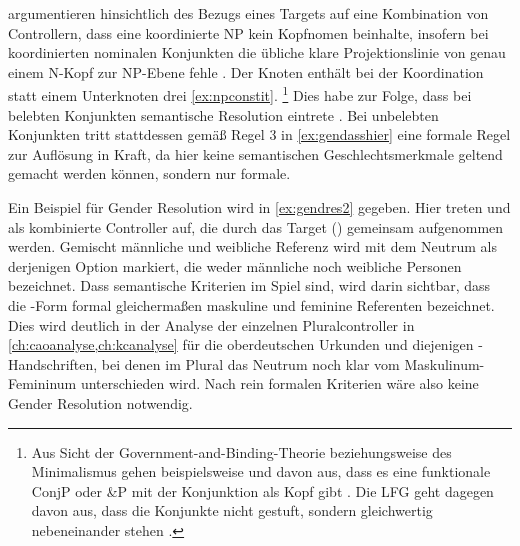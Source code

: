 \textcites[182--183]{wechslerzlatic2003}[576]{wechsler2009} argumentieren
hinsichtlich des Bezugs eines Targets auf eine Kombination von Controllern,
dass eine koordinierte NP kein Kopf\-nomen beinhalte, insofern bei
koordinierten nominalen Konjunkten die übliche klare Projektionslinie von genau
einem N-Kopf zur NP-Ebene fehle \autocites[183,
Anm.~85]{wechslerzlatic2003}[585, Anm.~7]{wechsler2009}. Der Knoten 
enthält bei der Koordination statt einem Unterknoten drei \cref{ex:npconstit}.%
%
	\footnote{Aus Sicht der Government-and-Binding-Theorie beziehungsweise des
	Minimalismus gehen beispielsweise
	\textcites{johannessen1998}{johannessen2005} und \citet{shen2019} davon aus, dass es
	eine funktionale ConjP oder \&P mit der Konjunktion als Kopf gibt
	\autocite[dagegen aber][]{borsley2005}. Die LFG geht dagegen davon aus,
	dass die Konjunkte nicht gestuft, sondern gleichwertig nebeneinander stehen
	\autocites[vgl.~z.\,B.][]{peterson2004}{sadlernordlinger2006}.}
%
Dies habe zur Folge, dass bei belebten Konjunkten semantische Resolution
eintrete \autocites[183]{wechslerzlatic2003}[576]{wechsler2009}. Bei unbelebten
Konjunkten tritt stattdessen gemäß Regel 3 in \cref{ex:gendasshier} eine
formale Regel zur Auflösung in Kraft, da hier keine semantischen
Geschlechtsmerkmale geltend gemacht werden können, sondern nur formale.

Ein Beispiel für Gender Resolution wird in \cref{ex:gendres2} gegeben. Hier
treten   und 
 als kombinierte Controller auf, die durch das
Target  (\NeutMF) gemeinsam aufgenommen werden. Gemischt männliche
und weibliche Referenz wird mit dem Neutrum als derjenigen Option markiert,
die weder männliche noch weibliche Personen bezeichnet. Dass semantische
Kriterien im Spiel sind, wird darin sichtbar, dass die -Form formal
gleichermaßen maskuline und feminine Referenten bezeichnet. Dies wird deutlich
in der Analyse der einzelnen Pluralcontroller in
\cref{ch:caoanalyse,ch:kcanalyse} für die oberdeutschen Urkunden und diejenigen
\citet{kc}-Handschriften, bei denen im Plural das Neutrum noch klar vom
Maskulinum-Femininum unterschieden wird. Nach rein formalen Kriterien wäre also
keine Gender Resolution notwendig.


